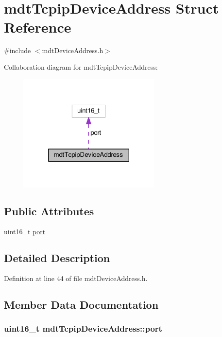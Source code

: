\hypertarget{structmdt_tcpip_device_address}{\section{mdt\-Tcpip\-Device\-Address Struct Reference}
\label{structmdt_tcpip_device_address}
}


{\ttfamily \#include $<$mdt\-Device\-Address.\-h$>$}



Collaboration diagram for mdt\-Tcpip\-Device\-Address\-:\nopagebreak
\begin{figure}[H]
\begin{center}
\leavevmode
\includegraphics[width=202pt]{structmdt_tcpip_device_address__coll__graph}
\end{center}
\end{figure}
\subsection*{Public Attributes}
\begin{DoxyCompactItemize}
\item 
uint16\-\_\-t \hyperlink{structmdt_tcpip_device_address_a0c35eb6aaab0aafcaa7175c19979f81d}{port}
\end{DoxyCompactItemize}


\subsection{Detailed Description}


Definition at line 44 of file mdt\-Device\-Address.\-h.



\subsection{Member Data Documentation}
\hypertarget{structmdt_tcpip_device_address_a0c35eb6aaab0aafcaa7175c19979f81d}{
\subsubsection[{port}]{\setlength{\rightskip}{0pt plus 5cm}uint16\-\_\-t mdt\-Tcpip\-Device\-Address\-::port}}\label{structmdt_tcpip_device_address_a0c35eb6aaab0aafcaa7175c19979f81d}


